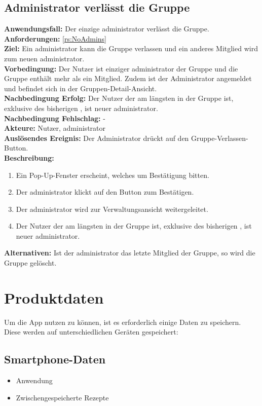 \documentclass[parskip=full]{scrartcl}
\newcommand{\changelocaltocdepth}[1]{%
  \addtocontents{toc}{\protect\setcounter{tocdepth}{#1}}%
  \setcounter{tocdepth}{#1}%
}
\newcommand{\enablesubsectionnumbering}[1]{
    \renewcommand{\thesubsection}{$\langle$#1\arabic{subsection}0$\rangle$}
    \changelocaltocdepth{1} 
}
\newcommand{\resetsubsectionnumbering}{
    \renewcommand{\thesubsection}{\arabic{section}.\arabic{subsection}}
    \changelocaltocdepth{3} 
}
\begin{document}
\subsection{Administrator verlässt die Gruppe}
\textbf{Anwendungsfall:} Der einzige \gls{administrator} verlässt die Gruppe.\\
\textbf{Anforderungen:} \ref{rs:NoAdmins}\\
\textbf{Ziel:} Ein \gls{administrator} kann die Gruppe verlassen und ein anderes Mitglied wird zum neuen \gls{administrator}.\\
\textbf{Vorbedingung:} Der Nutzer ist einziger \gls{administrator} der Gruppe und die Gruppe enthält mehr als ein Mitglied. Zudem ist der Administrator angemeldet und befindet sich in der Gruppen-Detail-Ansicht.\\
\textbf{Nachbedingung Erfolg:} Der Nutzer der am längsten in der Gruppe ist, exklusive des bisherigen , ist neuer \gls{administrator}.\\
\textbf{Nachbedingung Fehlschlag:} -\\
\textbf{Akteure:} Nutzer, \gls{administrator}\\
\textbf{Auslösendes Ereignis:} Der Administrator drückt auf den Gruppe-Verlassen-Button.\\
\textbf{Beschreibung:}
\begin{enumerate}
    \item Ein Pop-Up-Fenster erscheint, welches um Bestätigung bitten.
    \item Der \gls{administrator} klickt auf den Button zum Bestätigen.
    \item Der \gls{administrator} wird zur Verwaltungsansicht weitergeleitet.
    \item Der Nutzer der am längsten in der Gruppe ist, exklusive des bisherigen , ist neuer \gls{administrator}. 
\end{enumerate}
\textbf{Alternativen:} Ist der \gls{administrator} das letzte Mitglied der Gruppe, so wird die Gruppe gelöscht.
\resetsubsectionnumbering
\newpage

\section{Produktdaten}
\enablesubsectionnumbering{D}
Um die App nutzen zu können, ist es erforderlich einige Daten zu speichern. Diese werden auf unterschiedlichen Geräten gespeichert:

\subsection{Smartphone-Daten}
\begin{itemize}
    \item Anwendung
    \item Zwischengespeicherte Rezepte
\end{itemize}
\end{document}
